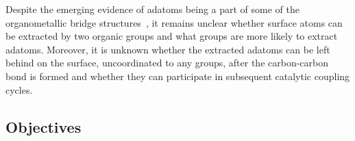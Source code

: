 \documentclass[aps,prb,reprint,amsmath,amssymb]{revtex4-1}
\newcommand{\lock}{\color{red}}
\newcommand{\lock}{\color{black}}
\begin{document}
\fi
{\lock

Despite the emerging evidence of adatoms being a part of some of the organometallic bridge structures~\cite{acsnano2017, acsnano2019}, it remains unclear whether surface atoms can be extracted by two organic groups and what groups are more likely to extract adatoms. Moreover, it is unknown whether the extracted adatoms can be left behind on the surface, uncoordinated to any groups, after the carbon-carbon bond is formed and whether they can participate in subsequent catalytic coupling cycles.


}

\ifdefined\INTERNAL

\subsection{Objectives}

\fi
\end{document}
